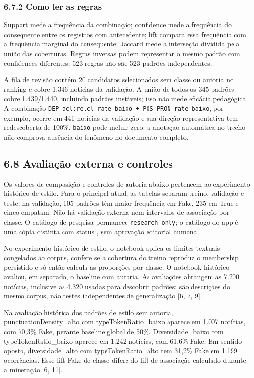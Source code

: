 \documentclass[
  brazilian,
  11pt,
]{article}
\begin{document}
\subsubsection{6.7.2 Como ler as regras}

Support mede a frequência da combinação; confidence mede a frequência do consequente entre os registros com antecedente; lift compara essa frequência com a frequência marginal do consequente; Jaccard mede a interseção dividida pela união das coberturas. Regras inversas podem representar o mesmo padrão com confidences diferentes: 523 regras não são 523 padrões independentes.

A fila de revisão contém 20 candidatos selecionados sem classe ou autoria no ranking e cobre 1.346 notícias da validação. A união de todos os 345 padrões cobre 1.439/1.440, incluindo padrões instáveis; isso não mede eficácia pedagógica. A combinação \texttt{DEP\_acl:relcl\_rate\_baixo + POS\_PRON\_rate\_baixo}, por exemplo, ocorre em 441 notícias da validação e sua direção representativa tem redescoberta de 100\%. \texttt{baixo} pode incluir zero: a anotação automática no trecho não comprova ausência do fenômeno no documento completo.

\subsection{6.8 Avaliação externa e controles}\label{avaliauxe7uxe3o-externa-e-controles}

Os valores de composição e controles de autoria abaixo pertencem ao experimento histórico de estilo. Para o principal atual, as tabelas separam treino, validação e teste: na validação, 105 padrões têm maior frequência em Fake, 235 em True e cinco empatam. Não há validação externa nem intervalos de associação por classe. O catálogo de pesquisa permanece \texttt{research\_only}; o catálogo do app é uma cópia distinta com status , sem aprovação editorial humana.


No experimento histórico de estilo, o notebook aplica os limites textuais congelados ao corpus, confere se a cobertura do treino reproduz o membership persistido e só então calcula as proporções por classe. O notebook histórico avaliou, em separado, o baseline com autoria. As avaliações abrangem as 7.200 notícias, inclusive as 4.320 usadas para descobrir padrões: são descrições do mesmo corpus, não testes independentes de generalização {[}6, 7, 9{]}.

Na avaliação histórica dos padrões de estilo sem autoria, punctuationDensity\_alto com typeTokenRatio\_baixo aparece em 1.007 notícias, com 70,3\% Fake, perante baseline global de 50\%. Diversidade\_baixo com typeTokenRatio\_baixo aparece em 1.242 notícias, com 61,6\% Fake. Em sentido oposto, diversidade\_alto com typeTokenRatio\_alto tem 31,2\% Fake em 1.199 ocorrências. Esse lift Fake de classe difere do lift de associação calculado durante a mineração {[}6, 11{]}.
\end{document}
